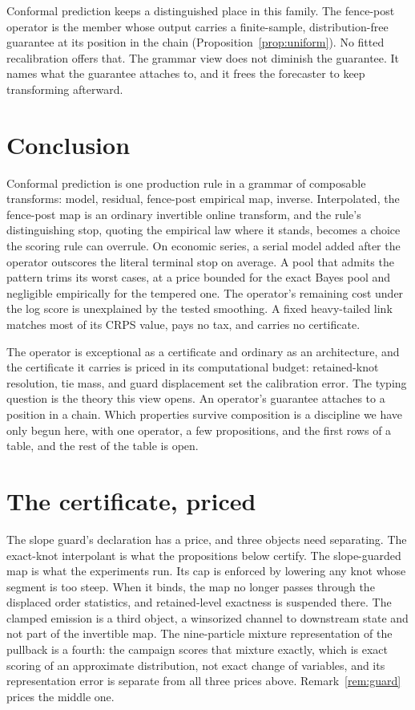\documentclass[11pt]{article}
\theoremstyle{remark}
\begin{document}
Conformal prediction keeps a distinguished place in this family. The fence-post operator is the member whose output carries a
finite-sample, distribution-free guarantee at its position in the chain
(Proposition~\ref{prop:uniform}). No fitted recalibration offers that. The grammar view
does not diminish the guarantee. It names what the guarantee attaches to, and it frees the
forecaster to keep transforming afterward.

\section{Conclusion}\label{sec:conclusion}

Conformal prediction is one production rule in a grammar of composable transforms: model,
residual, fence-post empirical map, inverse. Interpolated, the fence-post map is an ordinary
invertible online transform, and the rule's distinguishing stop, quoting the empirical law
where it stands, becomes a choice the scoring rule can overrule. On economic series,
a serial model added after the operator outscores the literal terminal stop on
average. A pool that admits the pattern trims its worst cases, at a price bounded for
the exact Bayes pool and negligible empirically for the tempered one. The operator's
remaining cost under the log score is unexplained by the tested smoothing. A fixed
heavy-tailed link matches most of its CRPS value, pays no tax, and carries no
certificate.

The operator is exceptional as a certificate and ordinary as an architecture, and
the certificate it carries is priced in its computational budget: retained-knot
resolution, tie mass, and guard displacement set the calibration error. The
typing question is the theory this view opens. An operator's guarantee attaches to a position in a chain. Which properties survive
composition is a discipline we have only begun here, with one operator, a few
propositions, and the first rows of a table, and the rest of the table is open.

\appendix
\section{The certificate, priced}\label{app:certificate}

The slope guard's declaration has a price, and three objects need separating. The exact-knot
interpolant is what the propositions below certify. The
slope-guarded map is what the experiments run. Its cap is enforced by lowering any
knot whose segment is too steep. When it binds, the map no longer passes through the
displaced order statistics, and retained-level exactness is suspended there. The
clamped emission is a third object, a winsorized channel to downstream state and not
part of the invertible map. The nine-particle mixture representation of the pullback
is a fourth: the campaign scores that mixture exactly, which is exact scoring of an
approximate distribution, not exact change of variables, and its representation error
is separate from all three prices above. Remark~\ref{rem:guard} prices the middle one.
\end{document}
